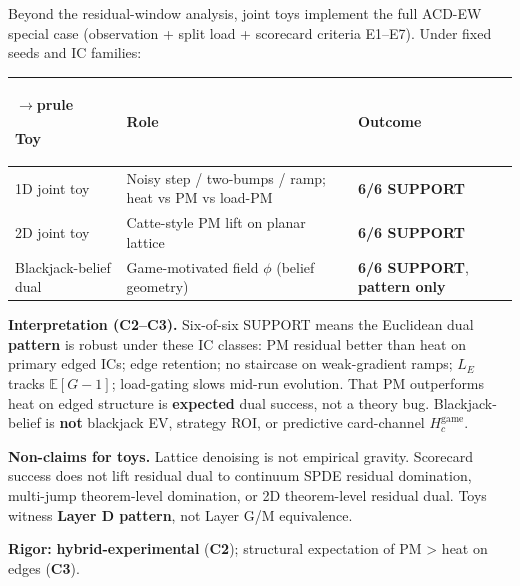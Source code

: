 \documentclass[
  11pt,
]{article}
\newcounter{none} %
\begin{document}
Beyond the residual-window analysis, joint toys implement the full ACD-EW special case (observation + split load + scorecard criteria E1--E7). Under fixed seeds and IC families:

{\def\LTcaptype{none} %
\begin{longtable}[]{@{}
  >{\raggedright\arraybackslash}p{}
  >{\raggedright\arraybackslash}p{}
  >{\raggedright\arraybackslash}p{}@{}}
$\rightarrow$prule\noalign{}
\begin{minipage}[b]{\linewidth}\raggedright
Toy
\end{minipage} & \begin{minipage}[b]{\linewidth}\raggedright
Role
\end{minipage} & \begin{minipage}[b]{\linewidth}\raggedright
Outcome
\end{minipage} \\
\midrule\noalign{}
\endhead
\bottomrule\noalign{}
\endlastfoot
1D joint toy & Noisy step / two-bumps / ramp; heat vs PM vs load-PM & \textbf{6/6 SUPPORT} \\
2D joint toy & Catte-style PM lift on planar lattice & \textbf{6/6 SUPPORT} \\
Blackjack-belief dual & Game-motivated field \(\phi\) (belief geometry) & \textbf{6/6 SUPPORT}, \textbf{pattern only} \\
\end{longtable}
}

\textbf{Interpretation (C2--C3).} Six-of-six SUPPORT means the Euclidean dual \textbf{pattern} is robust under these IC classes: PM residual better than heat on primary edged ICs; edge retention; no staircase on weak-gradient ramps; \(L_E\) tracks \(\mathbb{E}[G-1]\); load-gating slows mid-run evolution. That PM outperforms heat on edged structure is \textbf{expected} dual success, not a theory bug. Blackjack-belief is \textbf{not} blackjack EV, strategy ROI, or predictive card-channel \(H_c^{\mathrm{game}}\).

\textbf{Non-claims for toys.} Lattice denoising is not empirical gravity. Scorecard success does not lift residual dual to continuum SPDE residual domination, multi-jump theorem-level domination, or 2D theorem-level residual dual. Toys witness \textbf{Layer D pattern}, not Layer G/M equivalence.

\textbf{Rigor:} \textbf{hybrid-experimental} (\textbf{C2}); structural expectation of PM \textgreater{} heat on edges (\textbf{C3}).
\end{document}
